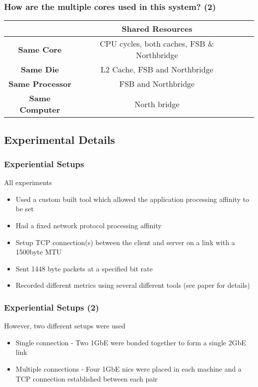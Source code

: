 \documentclass{beamer}
\begin{document}
\begin{frame}
    \frametitle{How are the multiple cores used in this system? (2)}
  	\begin{table}[tb]
       		 \begin{tabular}{|c|c|c|l|} \hline
                                  & Shared Resources \\ \hline
    	    \textbf{Same Core}        & CPU cycles, both caches, FSB \& Northbridge    \\ \hline
	       	\textbf{Same Die}         & L2 Cache, FSB and Northbridge \\ \hline
    	    \textbf{Same Processor}   & FSB and Northbridge \\ \hline
	        \textbf{Same Computer}    & North bridge  \\ \hline
        	\end{tabular}	
	\end{table}
\end{frame}

\subsection[Using Multiple Cores]{Experimental Details}
\begin{frame}
    \frametitle{Experiential Setups}
	All experiments 
	\begin{itemize}
		\item Used a custom built tool which allowed the application processing affinity to be set
		\item Had a fixed network protocol processing affinity
		\item Setup TCP connection(s) between the client and server on a link with a 1500byte MTU
		\item Sent 1448 byte packets at a specified bit rate
		\item Recorded different metrics using several different tools (see paper for details)
	\end{itemize}
	
\end{frame}

\begin{frame}
    \frametitle{Experiential Setups (2)}
    However, two different setups were used
	\begin{itemize}
		\item Single connection - Two 1GbE were bonded together to form a single 2GbE link
		\item Multiple connections - Four 1GbE nics were placed in each machine and a TCP connection established between each pair
	\end{itemize}
\end{frame}
\end{document}
